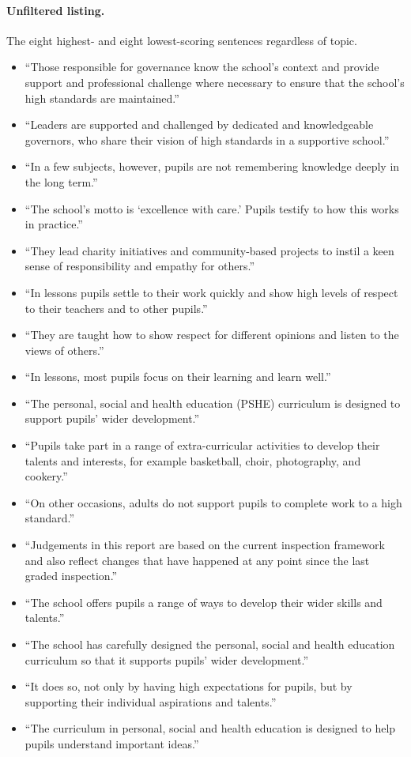 \paragraph{Unfiltered listing.} The eight highest- and eight lowest-scoring sentences regardless of topic.
\begin{itemize}
  \item ``Those responsible for governance know the school's context and provide support and professional challenge where necessary to ensure that the school's high standards are maintained.''
  \item ``Leaders are supported and challenged by dedicated and knowledgeable governors, who share their vision of high standards in a supportive school.''
  \item ``In a few subjects, however, pupils are not remembering knowledge deeply in the long term.''
  \item ``The school's motto is `excellence with care.' Pupils testify to how this works in practice.''
  \item ``They lead charity initiatives and community-based projects to instil a keen sense of responsibility and empathy for others.''
  \item ``In lessons pupils settle to their work quickly and show high levels of respect to their teachers and to other pupils.''
  \item ``They are taught how to show respect for different opinions and listen to the views of others.''
  \item ``In lessons, most pupils focus on their learning and learn well.''
\end{itemize}
\begin{itemize}
  \item ``The personal, social and health education (PSHE) curriculum is designed to support pupils' wider development.''
  \item ``Pupils take part in a range of extra-curricular activities to develop their talents and interests, for example basketball, choir, photography, and cookery.''
  \item ``On other occasions, adults do not support pupils to complete work to a high standard.''
  \item ``Judgements in this report are based on the current inspection framework and also reflect changes that have happened at any point since the last graded inspection.''
  \item ``The school offers pupils a range of ways to develop their wider skills and talents.''
  \item ``The school has carefully designed the personal, social and health education curriculum so that it supports pupils' wider development.''
  \item ``It does so, not only by having high expectations for pupils, but by supporting their individual aspirations and talents.''
  \item ``The curriculum in personal, social and health education is designed to help pupils understand important ideas.''
\end{itemize}
